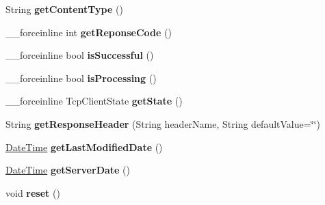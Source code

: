 \begin{DoxyCompactItemize}
\item 
\hypertarget{class_http_client_ac22516dfd9d8ac4db332cd25000528ef}{}String {\bfseries get\+Content\+Type} ()\label{class_http_client_ac22516dfd9d8ac4db332cd25000528ef}

\item 
\hypertarget{class_http_client_a0eeebce9727415d6a7fce58e5512a74b}{}\+\_\+\+\_\+forceinline int {\bfseries get\+Reponse\+Code} ()\label{class_http_client_a0eeebce9727415d6a7fce58e5512a74b}

\item 
\hypertarget{class_http_client_a06a7fec48b726f4351606267d4afceb9}{}\+\_\+\+\_\+forceinline bool {\bfseries is\+Successful} ()\label{class_http_client_a06a7fec48b726f4351606267d4afceb9}

\item 
\hypertarget{class_http_client_a56fdb130ddfb0a6e6c17d6110d644345}{}\+\_\+\+\_\+forceinline bool {\bfseries is\+Processing} ()\label{class_http_client_a56fdb130ddfb0a6e6c17d6110d644345}

\item 
\hypertarget{class_http_client_a3967c52ec17e82f469e6d96c00210e7a}{}\+\_\+\+\_\+forceinline Tcp\+Client\+State {\bfseries get\+State} ()\label{class_http_client_a3967c52ec17e82f469e6d96c00210e7a}

\item 
\hypertarget{class_http_client_acb02f4ea408d30405d0f7786810f4db0}{}String {\bfseries get\+Response\+Header} (String header\+Name, String default\+Value=\char`\"{}\char`\"{})\label{class_http_client_acb02f4ea408d30405d0f7786810f4db0}

\item 
\hypertarget{class_http_client_a486812ccc76aa2f9d5bae27b2e46f4dc}{}\hyperlink{class_date_time}{Date\+Time} {\bfseries get\+Last\+Modified\+Date} ()\label{class_http_client_a486812ccc76aa2f9d5bae27b2e46f4dc}

\item 
\hypertarget{class_http_client_af56610a0d5b1e5f36b56ffab0f3d0134}{}\hyperlink{class_date_time}{Date\+Time} {\bfseries get\+Server\+Date} ()\label{class_http_client_af56610a0d5b1e5f36b56ffab0f3d0134}

\item 
\hypertarget{class_http_client_add736676d2310312697766b3fa1cc54d}{}void {\bfseries reset} ()\label{class_http_client_add736676d2310312697766b3fa1cc54d}

\end{DoxyCompactItemize}

